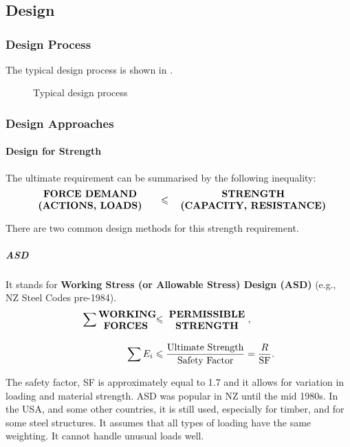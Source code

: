 \part{}
\chapter{Design}
\section{Design Process}
The typical design process is shown in .
\begin{figure}[p]
\centering

\caption{Typical design process}\label{fig:design_flow}
\end{figure}
\section{Design Approaches}
\subsection{Design for Strength}
The ultimate requirement can be summarised by the following inequality:
\begin{gather}
\parbox{5cm}{\bfseries\centering{}FORCE DEMAND\\(ACTIONS, LOADS)}\leqslant\parbox{6cm}{\bfseries\centering{}STRENGTH\\(CAPACITY, RESISTANCE)}
\end{gather}

There are two common design methods for this strength requirement.
\subsubsection{ASD}
It stands for \textbf{Working Stress (or Allowable Stress) Design (ASD)} (e.g., NZ Steel Codes pre-1984).
\begin{align*}
\sum\parbox{2cm}{\bfseries\centering{}WORKING\\FORCES}&\leqslant\parbox{3cm}{\bfseries\centering{}PERMISSIBLE\\STRENGTH},\\[4mm]
\sum{}E_i&\leqslant\dfrac{\text{Ultimate Strength}}{\text{Safety Factor}}=\dfrac{R}{\text{SF}}.
\end{align*}

The safety factor, SF is approximately equal to \num{1.7} and it allows for variation in loading and material strength. ASD was popular in NZ until the mid 1980s. In the USA, and some other countries, it is still used, especially for timber, and for some steel structures. It assumes that all types of loading have the same weighting. It cannot handle unusual loads well.
